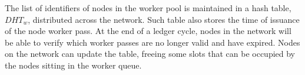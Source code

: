 The list of identifiers of nodes in the worker pool is maintained in a hash table, $DHT_w$, distributed across the network. Such table also stores the time of issuance of the node worker pass. At the end of a ledger cycle, nodes in the network will be able to verify which worker passes are no longer valid and have expired. Nodes on the network can update the table, freeing some slots that can be occupied by the nodes sitting in the worker queue. \\

